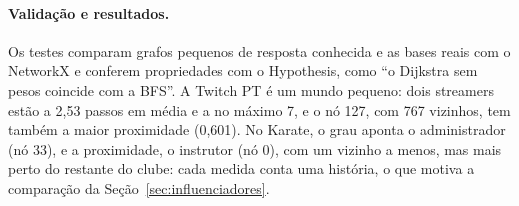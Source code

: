 \paragraph{Validação e resultados.} Os testes comparam grafos pequenos de resposta conhecida e as
bases reais com o NetworkX e conferem propriedades com o Hypothesis, como ``o Dijkstra sem pesos
coincide com a BFS''. A Twitch PT é um mundo pequeno: dois
streamers estão a 2,53 passos em média e a no máximo 7, e o nó 127, com 767 vizinhos, tem também a
maior proximidade (0,601). No Karate, o grau aponta o administrador (nó 33), e a proximidade, o
instrutor (nó 0), com um vizinho a menos, mas mais perto do restante do clube: cada medida conta uma
história, o que motiva a comparação da Seção~\ref{sec:influenciadores}.
